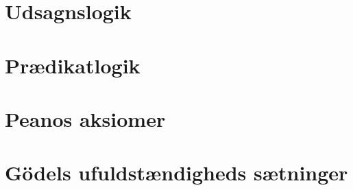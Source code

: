 \documentclass[a4paper]{article}
\theoremstyle{definition}
\theoremstyle{remark}
\begin{document}
\section{Udsagnslogik}


\section{Prædikatlogik}


\section{Peanos aksiomer}


\section{Gödels ufuldstændigheds sætninger}

\end{document}
